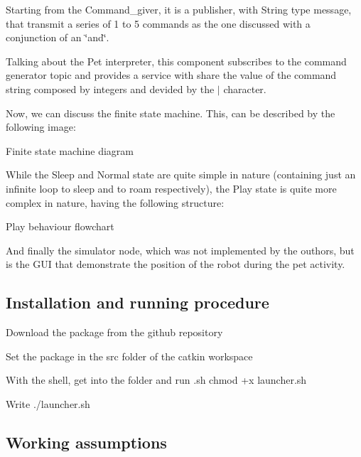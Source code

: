 Starting from the Command\+\_\+giver, it is a publisher, with String type message, that transmit a series of 1 to 5 commands as the one discussed with a conjunction of an \char`\"{}and\char`\"{}.

Talking about the Pet interpreter, this component subscribes to the command generator topic and provides a service with share the value of the command string composed by integers and devided by the \textquotesingle{}$\vert$\textquotesingle{} character.

Now, we can discuss the finite state machine. This, can be described by the following image\+:

 \begin{center}Finite state machine diagram\end{center}  While the \textquotesingle{}Sleep\textquotesingle{} and \textquotesingle{}Normal\textquotesingle{} state are quite simple in nature (containing just an infinite loop to sleep and to roam respectively), the \textquotesingle{}Play\textquotesingle{} state is quite more complex in nature, having the following structure\+:  \begin{center}Play behaviour flowchart\end{center} 

And finally the simulator node, which was not implemented by the outhors, but is the G\+UI that demonstrate the position of the robot during the pet activity.

\subsection*{Installation and running procedure}


\begin{DoxyItemize}
\item Download the package from the github repository
\item Set the package in the src folder of the catkin workspace
\item With the shell, get into the folder and run \textquotesingle{}\textquotesingle{}\textquotesingle{}.sh chmod +x launcher.\+sh \textquotesingle{}\textquotesingle{}\textquotesingle{}
\item Write ./launcher.sh
\end{DoxyItemize}

\subsection*{Working assumptions}

